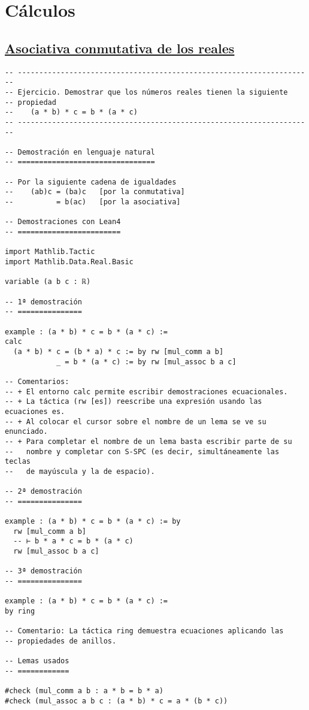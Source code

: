 \section{Cálculos}
\label{sec:orgc0a77d3}

\subsection{\href{./src/Basicos/Asociativa\_conmutativa\_de\_los\_reales.lean}{Asociativa conmutativa de los reales}}
\label{sec:org55860a3}
\begin{verbatim}
-- ---------------------------------------------------------------------
-- Ejercicio. Demostrar que los números reales tienen la siguiente
-- propiedad
--    (a * b) * c = b * (a * c)
-- ---------------------------------------------------------------------

-- Demostración en lenguaje natural
-- ================================

-- Por la siguiente cadena de igualdades
--    (ab)c = (ba)c   [por la conmutativa]
--          = b(ac)   [por la asociativa]

-- Demostraciones con Lean4
-- ========================

import Mathlib.Tactic
import Mathlib.Data.Real.Basic

variable (a b c : ℝ)

-- 1ª demostración
-- ===============

example : (a * b) * c = b * (a * c) :=
calc
  (a * b) * c = (b * a) * c := by rw [mul_comm a b]
            _ = b * (a * c) := by rw [mul_assoc b a c]

-- Comentarios:
-- + El entorno calc permite escribir demostraciones ecuacionales.
-- + La táctica (rw [es]) reescribe una expresión usando las ecuaciones es.
-- + Al colocar el cursor sobre el nombre de un lema se ve su enunciado.
-- + Para completar el nombre de un lema basta escribir parte de su
--   nombre y completar con S-SPC (es decir, simultáneamente las teclas
--   de mayúscula y la de espacio).

-- 2ª demostración
-- ===============

example : (a * b) * c = b * (a * c) := by
  rw [mul_comm a b]
  -- ⊢ b * a * c = b * (a * c)
  rw [mul_assoc b a c]

-- 3ª demostración
-- ===============

example : (a * b) * c = b * (a * c) :=
by ring

-- Comentario: La táctica ring demuestra ecuaciones aplicando las
-- propiedades de anillos.

-- Lemas usados
-- ============

#check (mul_comm a b : a * b = b * a)
#check (mul_assoc a b c : (a * b) * c = a * (b * c))
\end{verbatim}

